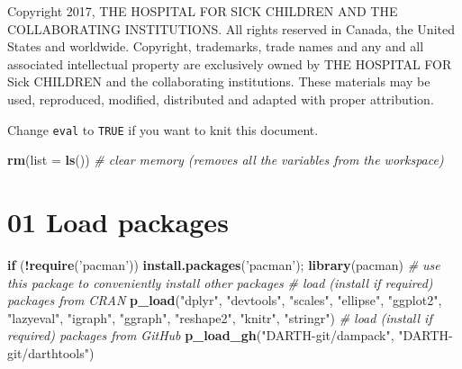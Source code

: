 \documentclass[
]{article}
\newenvironment{Shaded}{\begin{snugshade}}{\end{snugshade}}
\newcommand{\CommentTok}[1]{\textcolor[rgb]{0.56,0.35,0.01}{\textit{#1}}}
\newcommand{\ControlFlowTok}[1]{\textcolor[rgb]{0.13,0.29,0.53}{\textbf{#1}}}
\newcommand{\DataTypeTok}[1]{\textcolor[rgb]{0.13,0.29,0.53}{#1}}
\newcommand{\KeywordTok}[1]{\textcolor[rgb]{0.13,0.29,0.53}{\textbf{#1}}}
\newcommand{\NormalTok}[1]{#1}
\newcommand{\OperatorTok}[1]{\textcolor[rgb]{0.81,0.36,0.00}{\textbf{#1}}}
\newcommand{\StringTok}[1]{\textcolor[rgb]{0.31,0.60,0.02}{#1}}
\begin{document}
Copyright 2017, THE HOSPITAL FOR SICK CHILDREN AND THE COLLABORATING
INSTITUTIONS. All rights reserved in Canada, the United States and
worldwide. Copyright, trademarks, trade names and any and all associated
intellectual property are exclusively owned by THE HOSPITAL FOR Sick
CHILDREN and the collaborating institutions. These materials may be
used, reproduced, modified, distributed and adapted with proper
attribution.

\newpage

Change \texttt{eval} to \texttt{TRUE} if you want to knit this document.

\begin{Shaded}
\begin{Highlighting}[]
\KeywordTok{rm}\NormalTok{(}\DataTypeTok{list =} \KeywordTok{ls}\NormalTok{())      }\CommentTok{# clear memory (removes all the variables from the workspace)}
\end{Highlighting}
\end{Shaded}

\hypertarget{load-packages}{%
\section{01 Load packages}\label{load-packages}}

\begin{Shaded}
\begin{Highlighting}[]
\ControlFlowTok{if}\NormalTok{ (}\OperatorTok{!}\KeywordTok{require}\NormalTok{(}\StringTok{'pacman'}\NormalTok{)) }\KeywordTok{install.packages}\NormalTok{(}\StringTok{'pacman'}\NormalTok{); }\KeywordTok{library}\NormalTok{(pacman) }\CommentTok{# use this package to conveniently install other packages}
\CommentTok{# load (install if required) packages from CRAN}
\KeywordTok{p_load}\NormalTok{(}\StringTok{"dplyr"}\NormalTok{, }\StringTok{"devtools"}\NormalTok{, }\StringTok{"scales"}\NormalTok{, }\StringTok{"ellipse"}\NormalTok{, }\StringTok{"ggplot2"}\NormalTok{, }\StringTok{"lazyeval"}\NormalTok{, }\StringTok{"igraph"}\NormalTok{,  }\StringTok{"ggraph"}\NormalTok{, }\StringTok{"reshape2"}\NormalTok{, }\StringTok{"knitr"}\NormalTok{, }\StringTok{"stringr"}\NormalTok{)                                               }
\CommentTok{# load (install if required) packages from GitHub}
\KeywordTok{p_load_gh}\NormalTok{(}\StringTok{"DARTH-git/dampack"}\NormalTok{, }\StringTok{"DARTH-git/darthtools"}\NormalTok{)}
\end{Highlighting}
\end{Shaded}
\end{document}
